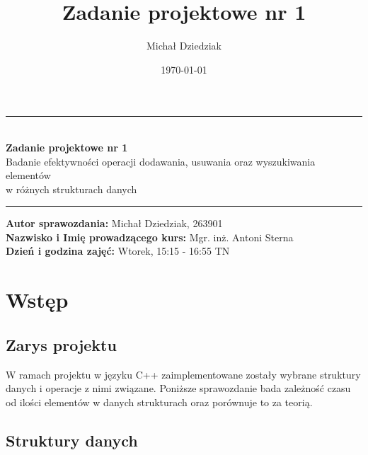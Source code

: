 \documentclass{article}
\title{Zadanie projektowe nr 1}
\author{Michał Dziedziak}
\date{\today}
\begin{document}
\begin{titlepage}
    \begin{center}
        \vspace*{5cm}
        \rule{500pt}{1pt}\\
        \vspace*{0.5cm}
        \LARGE
        \textbf{Zadanie projektowe nr 1}\\
        \Large
        Badanie efektywności operacji dodawania, usuwania oraz wyszukiwania elementów \\
        w różnych strukturach danych\\
        \vspace*{0.5cm}
        \rule{500pt}{1pt}
    \end{center}

    \vspace*{12cm}

    {\raggedright
        \large
        \textbf{Autor sprawozdania:} Michał Dziedziak,  263901\\
        \textbf{Nazwisko i Imię prowadzącego kurs:} Mgr. inż. Antoni Sterna\\
        \textbf{Dzień i godzina zajęć:} Wtorek, 15:15 - 16:55 TN
    }
\end{titlepage}


\tableofcontents
\listoftables
\listoffigures


\newpage

\section{Wstęp}
    \subsection{Zarys projektu}
    W ramach projektu w języku C++ zaimplementowane zostały wybrane struktury danych 
    i operacje z nimi związane. Poniższe sprawozdanie bada zależność czasu od ilości elementów w danych strukturach oraz porównuje to za teorią.

    \subsection{Struktury danych}
\end{document}
